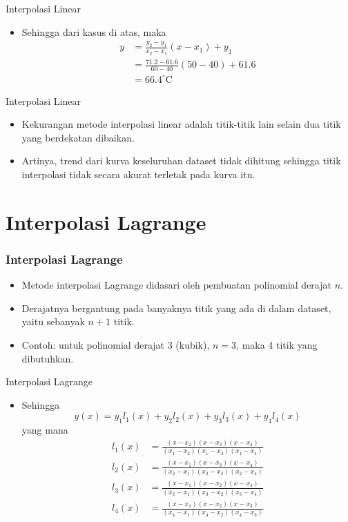 \documentclass[pdflatex,compress]{beamer}
\begin{document}
\begin{frame}{Interpolasi Linear}
	\begin{itemize}
		\item Sehingga dari kasus di atas, maka
		\begin{align*}
			y &= \frac{y_2 - y_1}{x_2 - x_1}(x - x_1) +  y_1 \\
			&= \frac{71.2 - 61.6}{60 - 40}(50 - 40) +  61.6 \\
			&= 66.4^\circ \text{C}
		\end{align*}
	\end{itemize}
\end{frame}

\begin{frame}{Interpolasi Linear}
	\begin{itemize}
		\item Kekurangan metode interpolasi linear adalah titik-titik lain selain dua titik yang berdekatan dibaikan.
		\item Artinya, trend dari kurva keseluruhan dataset tidak dihitung sehingga titik interpolasi tidak secara akurat terletak pada kurva itu.
	\end{itemize}
\end{frame}

\section{Interpolasi Lagrange}

\begin{frame}
	\frametitle{Interpolasi Lagrange}
	\begin{itemize}
		\item Metode interpolasi Lagrange didasari oleh pembuatan polinomial derajat $ n $.
		\item Derajatnya bergantung pada banyaknya titik yang ada di dalam dataset, yaitu sebanyak $ n + 1 $ titik.
		\item Contoh: untuk polinomial derajat 3 (kubik), $ n = 3 $, maka 4 titik yang dibutuhkan.
	\end{itemize}
\end{frame}

\begin{frame}{Interpolasi Lagrange}
	\begin{itemize}
		\item Sehingga
		\begin{equation*}
			y(x) = y_1 l_1(x) + y_2 l_2(x) + y_3 l_3(x) + y_4 l_4(x)
		\end{equation*}
		yang mana
		\begin{align*}
			l_1(x) &= \frac{(x-x_2)(x-x_3)(x-x_4)}{(x_1-x_2)(x_1-x_3)(x_1-x_4)} \\
			l_2(x) &= \frac{(x-x_1)(x-x_3)(x-x_4)}{(x_2-x_1)(x_2-x_3)(x_2-x_4)} \\
			l_3(x) &= \frac{(x-x_1)(x-x_2)(x-x_4)}{(x_3-x_1)(x_3-x_2)(x_3-x_4)} \\
			l_4(x) &= \frac{(x-x_1)(x-x_2)(x-x_3)}{(x_4-x_1)(x_4-x_2)(x_4-x_3)}
		\end{align*}
	\end{itemize}
\end{frame}
\end{document}
